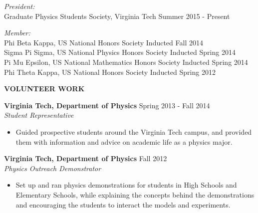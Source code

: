 \documentclass[10pt]{letter}
\begin{document}
{\it President:}\\
 Graduate Physics Students Society, Virginia Tech \hfill Summer 2015 - Present

 {\it Member:}\\
 Phi Beta Kappa, US National Honors Society \hfill Inducted Fall 2014\\
 Sigma Pi Sigma, US National Physics Honors Society \hfill Inducted Spring 2014\\
 Pi Mu Epsilon, US National Mathematics Honors Society \hfill Inducted Spring 2014\\
 Phi Theta Kappa, US National Honors Society \hfill Inducted Spring 2012\\
\setlength\parindent{0pt}

 

%
%
%

{\bf VOLUNTEER WORK}

{\bf Virginia Tech, Department of Physics} \hfill Spring 2013 - Fall 2014 \\ 
{\sl Student Representative} 

\vspace{-.25cm}

\begin{itemize} \itemsep -2pt
\item Guided prospective students around the Virginia Tech campus, and provided them with information and advice on academic life as a physics major. 
\end{itemize}

{\bf Virginia Tech, Department of Physics} \hfill Fall 2012\\
{\sl Physics Outreach Demonstrator} 
\vspace{-.25cm}

\begin{itemize} \itemsep -2pt
\item Set up and ran physics demonstrations for students in High Schools and Elementary Schools, while explaining the concepts behind the demonstrations and encouraging the students to interact the models and experiments. 
\end{itemize}
\end{document}
